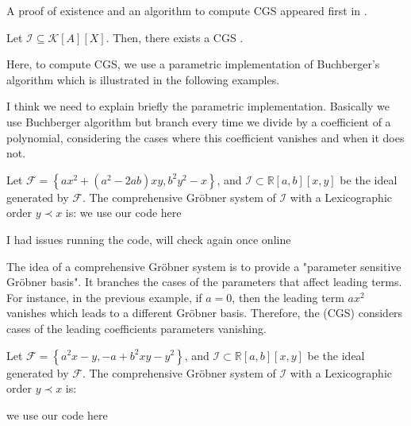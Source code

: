 \documentclass[runningheads]{llncs}
\newcommand{\Rr}{\mathbb{R}}
\newcommand{\1}{\chi}
\newcommand{\Ff}{\mathcal{F}}
\newcommand{\Ii}{\mathcal{I}}
\begin{document}
A proof of existence and an algorithm to compute CGS appeared first in \cite{weispfenning}.
\begin{theorem}
    Let $\mathcal{I}\subseteq\mathcal{K}[A][X]$. Then, there exists a CGS . 
\end{theorem}
Here, to compute CGS, we use a parametric implementation of 
Buchberger's algorithm which is illustrated in the following examples.

{\color{red} I think we need to explain briefly the parametric implementation. 
Basically we use Buchberger algorithm but branch every time we divide by a coefficient of a polynomial, considering the cases where this coefficient vanishes and when it does not. }

\begin{example}
    Let  $\Ff=\left\{a x^2+\left(a^2-2 a b\right) x y, b^2 y^2-x\right\}$, 
    and     
    $\Ii\subset \Rr[a,b][x,y]$ be the ideal generated by $\Ff$. 
    The comprehensive Gr{\"o}bner system of $\Ii$ with a Lexicographic order $y\prec x$ is:
    {\color{red} we use our code here}
    
    {\color{blue} I had issues running the code, will check again once online}
    
\end{example}
The idea of a comprehensive Gr{\"o}bner system is to provide a "parameter sensitive Gr{\"o}bner basis".
It branches the cases of the parameters that affect leading terms. For instance, in the previous
example, if $a=0$, then the leading term $a x^2$ vanishes which leads to a different Gr{\"o}bner basis. Therefore,
the (CGS) considers cases of the leading coefficients parameters vanishing.

\begin{example}
	Let $\Ff=\left\{a^2 x-y,-a+b^2 x
	y-y^2\right\}$, and 
 $\mathcal{I}\subset \Rr[a,b][x,y]$ be the ideal generated by $\Ff$.
    The comprehensive Gr{\"o}bner system of $\mathcal{I}$ with a Lexicographic order $y\prec x$ is:
    
    {\color{red} we use our code here}
\end{example}
\end{document}
